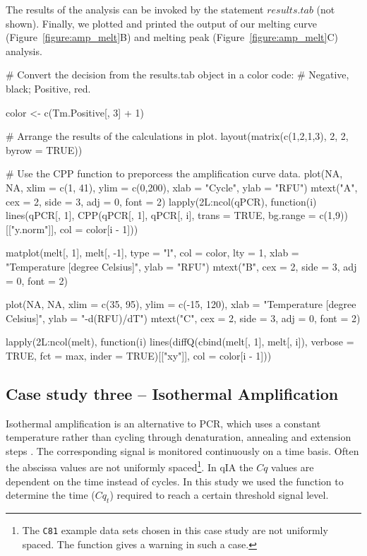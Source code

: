 The results of the analysis can be invoked by the statement $results.tab$ (not 
shown). Finally, we plotted and printed the output of our melting curve 
(Figure~\ref{figure:amp_melt}B) and melting peak 
(Figure~\ref{figure:amp_melt}C) 
analysis.

\begin{example}
# Convert the decision from the results.tab object in a color code:
# Negative, black; Positive, red.

color <- c(Tm.Positive[, 3] + 1)

# Arrange the results of the calculations in plot.
layout(matrix(c(1,2,1,3), 2, 2, byrow = TRUE))

# Use the CPP function to preporcess the amplification curve data.
plot(NA, NA, xlim = c(1, 41), ylim = c(0,200), xlab = "Cycle", ylab = "RFU")
mtext("A", cex = 2, side = 3, adj = 0, font = 2)
lapply(2L:ncol(qPCR), function(i) 
  lines(qPCR[, 1], 
        CPP(qPCR[, 1], qPCR[, i], trans = TRUE, 
            bg.range = c(1,9))[["y.norm"]],
        col = color[i - 1]))

matplot(melt[, 1], melt[, -1], type = "l", col = color, 
        lty = 1, xlab = "Temperature [degree Celsius]", ylab = "RFU")
mtext("B", cex = 2, side = 3, adj = 0, font = 2)

plot(NA, NA, xlim = c(35, 95), ylim = c(-15, 120), xlab = "Temperature [degree Celsius]", 
     ylab = "-d(RFU)/dT")
mtext("C", cex = 2, side = 3, adj = 0, font = 2)

lapply(2L:ncol(melt), function(i)
  lines(diffQ(cbind(melt[, 1], melt[, i]), verbose = TRUE, 
              fct = max, inder = TRUE)[["xy"]], col = color[i - 1]))
\end{example}

\subsection{Case study three -- Isothermal Amplification}
Isothermal amplification is an alternative to PCR, which uses a constant 
temperature rather than cycling through denaturation, annealing and extension 
steps \citep{rodiger_nucleic_2014}. The corresponding signal is monitored 
continuously on a time basis. Often the abscissa values are not uniformly 
spaced\footnote{The \texttt{C81} example data sets chosen in this case study 
are 
not uniformly spaced. The  function gives a warning in such a case.}. 
In qIA the $Cq$ values are dependent on the time instead of cycles. In this 
study we used the  function to determine the time ($Cq_{t}$) 
required to reach a certain threshold signal level.

